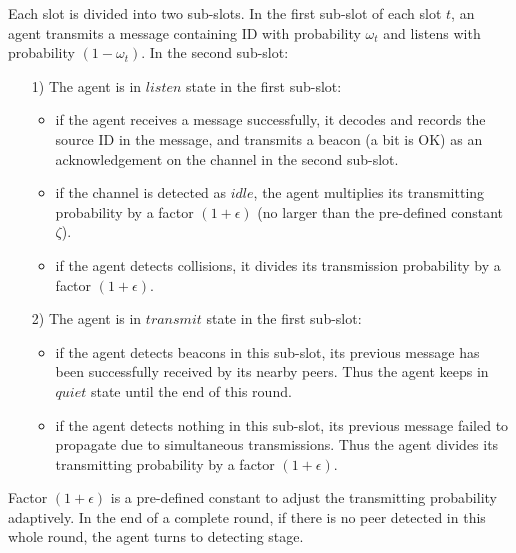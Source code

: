 Each slot is divided into two sub-slots.
In the first sub-slot of each slot $t$, an agent transmits a message containing ID 
with probability $\omega_t$ and listens with probability $(1 - \omega_t)$. 
In the second sub-slot: 
\begin{itemize}
    \item[1)] The agent is in $listen$ state in the first sub-slot:
    \begin{itemize}
    \item if the agent receives a message successfully, it 
    decodes and records the source ID in the message, and
    transmits a beacon (a bit is OK) as an acknowledgement 
    on the channel in the second sub-slot. 
    \item if the channel is detected as $idle$, the agent multiplies its transmitting 
    probability by a factor $(1+\epsilon)$ (no larger than the pre-defined constant $\zeta$).
    \item if the agent detects collisions, it divides its transmission 
    probability by a factor ${(1+\epsilon)}$. 
    \end{itemize}
    \item[2)] The agent is in $transmit$ state in the first sub-slot:
    \begin{itemize}
    \item if the agent detects beacons in this sub-slot,
    its previous message has been successfully received by its nearby
    peers. Thus the agent keeps in $quiet$ state until the end of this round.
    \item if the agent detects nothing in this sub-slot, its previous message
    failed to propagate due to simultaneous transmissions. Thus the agent divides its transmitting 
    probability by a factor ${(1+\epsilon)}$. 
    \end{itemize}
\end{itemize}

Factor ${(1+\epsilon)}$ is a pre-defined constant to adjust the transmitting probability adaptively.
In the end of a complete round, if there is no peer detected in this whole round, 
the agent turns to detecting stage.


